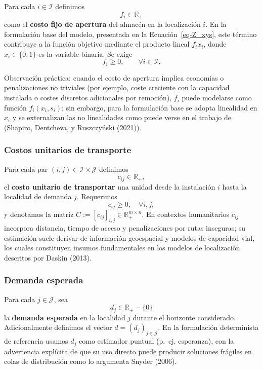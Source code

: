 \documentclass[
  spanish,
  us-letterpaper,
]{scrreprt}
\numberwithin{equation}{section}
\begin{document}
Para cada \(i\in\mathcal{I}\) definimos \[
f_i \in \mathbb{R}_{+}
\] como el \textbf{costo fijo de apertura} del almacén en la
localización \(i\). En la formulación base del modelo, presentada en la
Ecuación~\ref{eq-Z_xys}, este término contribuye a la función objetivo
mediante el producto lineal \(f_i x_i\), donde \(x_i \in \{0,1\}\) es la
variable binaria. Se exige\\
\[
f_i \ge 0, \qquad \forall i \in \mathcal{I}.
\]

Observación práctica: cuando el costo de apertura implica economías o
penalizaciones no triviales (por ejemplo, coste creciente con la
capacidad instalada o costes discretos adicionales por remoción),
\(f_i\) puede modelarse como función \(f_i(x_i,s_i)\); sin embargo, para
la formulación base se adopta linealidad en \(x_i\) y se externalizan
las no linealidades como puede verse en el trabajo de (Shapiro,
Dentcheva, y Ruszczyński (2021)).

\subsubsection{Costos unitarios de
transporte}\label{costos-unitarios-de-transporte}

Para cada par \((i,j)\in\mathcal{I}\times\mathcal{J}\) definimos \[
c_{ij}\in\mathbb{R}_{+},
\] el \textbf{costo unitario de transportar} una unidad desde la
instalación \(i\) hasta la localidad de demanda \(j\). Requerimos \[
c_{ij}\ge 0,\quad \forall i,j,
\] y denotamos la matriz
\(C:=[c_{ij}]_{i,j}\in\mathbb{R}_+^{m\times n}\). En contextos
humanitarios \(c_{ij}\) incorpora distancia, tiempo de acceso y
penalizaciones por rutas inseguras; su estimación suele derivar de
información geoespacial y modelos de capacidad vial, los cuales
constituyen insumos fundamentales en los modelos de localización
descritos por Daskin (2013).

\subsubsection{Demanda esperada}\label{demanda-esperada}

Para cada \(j\in\mathcal{J}\), sea \[
d_j\in\mathbb{R}_{+}-\{0\}
\] la \textbf{demanda esperada} en la localidad \(j\) durante el
horizonte considerado. Adicionalmente definimos el vector
\(d=(d_j)_{j\in\mathcal{J}}\). En la formulación determinista de
referencia usamos \(d_j\) como estimador puntual (p.~ej. esperanza), con
la advertencia explícita de que su uso directo puede producir soluciones
frágiles en colas de distribución como lo argumenta Snyder (2006).
\end{document}
